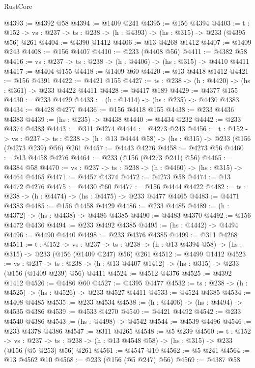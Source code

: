 \begin{lexlean}{RustCore}
\begin{coremodule}
@4393 := @4392 @58
@4394 := @1409 @241
@4395 := @156 @4394
@4403 := {t : @152} ->
  {vs : @237} -> {ts : @238} -> (h : @4393) -> (hs : @315) -> @233 (@4395 @56) @261
@4404 := @4390 @1412
@4406 := @13 @4268 @1412
@4407 := @1409 @243
@4408 := @156 @4407
@4410 := @233 (@4408 @56)
@4411 := @4382 @58
@4416 := {vs : @237} -> {ts : @238} -> (h : @4406) -> (hs : @315) -> @4410 @4411
@4417 := @4404 @155
@4418 := @1409 @60
@4420 := @13 @4418 @1412
@4421 := @156 @4391
@4422 := @4421 @155
@4427 := {ts : @238} -> (h : @4420) -> (hs : @361) -> @233 @4422 @4411
@4428 := @4417 @189
@4429 := @4377 @155
@4430 := @233 @4429
@4433 := (h : @1414) -> (hs : @235) -> @4430 @4383
@4434 := @4428 @4277
@4436 := @156 @4418 @155
@4438 := @233 @4436 @4383
@4439 := (hs : @235) -> @4438
@4440 := @4434 @232
@4442 := @233 @4374 @4383
@4443 := @311 @4274
@4444 := @4273 @243
@4456 := {t : @152} ->
  {vs : @237} ->
  {ts : @238} -> (h : @13 @4444 @58) -> (hs : @315) -> @233 (@156 (@4273 @239) @56) @261
@4457 := @4443 @4276
@4458 := @4273 @56
@4460 := @13 @4458 @4276
@4464 := @233 (@156 (@4273 @241) @56)
@4465 := @4384 @58
@4470 := {vs : @237} -> {ts : @238} -> (h : @4460) -> (hs : @315) -> @4464 @4465
@4471 := @4457 @4374
@4472 := @4273 @58
@4474 := @13 @4472 @4276
@4475 := @4430 @60
@4477 := @156 @4444 @4422
@4482 := {ts : @238} -> (h : @4474) -> (hs : @4475) -> @233 @4477 @4465
@4483 := @4471 @4383
@4485 := @156 @4458 @4429
@4486 := @233 @4485
@4489 := (h : @4372) -> (hs : @4438) -> @4486 @4385
@4490 := @4483 @4370
@4492 := @156 @4472 @4436
@4494 := @233 @4492 @4385
@4495 := (hs : @4442) -> @4494
@4496 := @4490 @4440
@4498 := @233 @4376 @4385
@4499 := @311 @4268
@4511 := {t : @152} ->
  {vs : @237} ->
  {ts : @238} -> (h : @13 @4394 @58) -> (hs : @315) -> @233 (@156 (@1409 @247) @56) @261
@4512 := @4499 @1412
@4523 := {vs : @237} ->
  {ts : @238} -> (h : @13 @4407 @1412) -> (hs : @315) -> @233 (@156 (@1409 @239) @56) @4411
@4524 := @4512 @4376
@4525 := @4392 @1412
@4526 := @4486 @60
@4527 := @4395 @4477
@4532 := {ts : @238} -> (h : @4525) -> (hs : @4526) -> @233 @4527 @4411
@4533 := @4524 @4385
@4534 := @4408 @4485
@4535 := @233 @4534
@4538 := (h : @4406) -> (hs : @4494) -> @4535 @4386
@4539 := @4533 @4270
@4540 := @4421 @4492
@4542 := @233 @4540 @4386
@4543 := (hs : @4498) -> @4542
@4544 := @4539 @4496
@4546 := @233 @4378 @4386
@4547 := @311 @4265
@4548 := @5 @239
@4560 := {t : @152} ->
  {vs : @237} -> {ts : @238} -> (h : @13 @4548 @58) -> (hs : @315) -> @233 (@156 (@5 @253) @56) @261
@4561 := @4547 @10
@4562 := @5 @241
@4564 := @13 @4562 @10
@4568 := @233 (@156 (@5 @247) @56)
@4569 := @4387 @58

\end{coremodule}
\end{lexlean}
